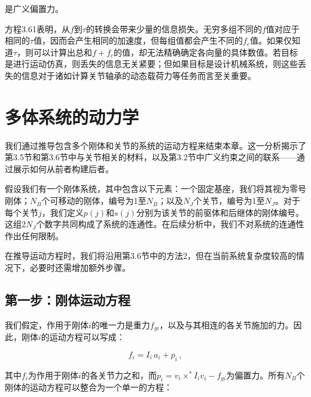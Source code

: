 \documentclass[10pt,a4paper]{book}
\theoremstyle{thmstyle} %
\theoremstyle{defstyle} %
\theoremstyle{prostyle} %
\begin{document}
是广义偏置力。



方程3.61表明，从$f$到$\tau$的转换会带来少量的信息损失。无穷多组不同的$f$值对应于相同的$\tau$值，因而会产生相同的加速度，但每组值都会产生不同的$f_{c}$值。如果仅知道$\tau$，则可以计算出总和$f + f_{c}$的值，却无法精确确定各向量的具体数值。若目标是进行运动仿真，则丢失的信息无关紧要；但如果目标是设计机械系统，则这些丢失的信息对于诸如计算关节轴承的动态载荷力等任务而言至关重要。



\section{多体系统的动力学}





我们通过推导包含多个刚体和关节的系统的运动方程来结束本章。这一分析揭示了第3.5节和第3.6节中与关节相关的材料，以及第3.2节中广义约束之间的联系——通过展示如何从前者构建后者。



假设我们有一个刚体系统，其中包含以下元素：一个固定基座，我们将其视为零号刚体；$N_{B}$个可移动的刚体，编号为1至$N_{B}$；以及$N_{J}$个关节，编号为1至$N_{J}$。对于每个关节$j$，我们定义$p(j)$和$s(j)$分别为该关节的前驱体和后继体的刚体编号。这组$2N_{J}$个数字共同构成了系统的连通性。在后续分析中，我们不对系统的连通性作出任何限制。



在推导运动方程时，我们将沿用第3.6节中的方法2，但在当前系统复杂度较高的情况下，必要时还需增加额外步骤。



\subsection{第一步：刚体运动方程}





我们假定，作用于刚体$i$的唯一力是重力$f_{gi}$，以及与其相连的各关节施加的力。因此，刚体$i$的运动方程可以写成：



$$
f _ { i } = I _ { i } \, a _ { i } + p _ { i } \, ,
$$



其中$f_{i}$为作用于刚体$i$的各关节力之和，而$p_{i} = v_{i} \times^{*} I_{i} v_{i} - f_{gi}$为偏置力。所有$N_{B}$个刚体的运动方程可以整合为一个单一的方程：
\end{document}
